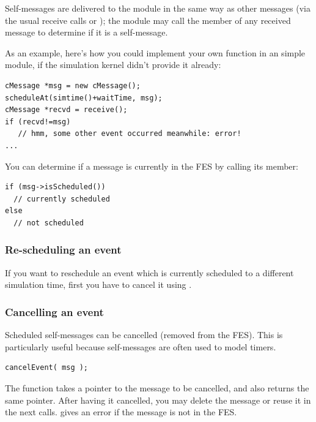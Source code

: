 Self-messages are delivered to the module in the same way as other
messages (via the usual receive calls or );
the module may call the  member of any received
message to determine if it is a self-message.

As an example, here's how you could implement your own 
function in an  simple module, if the simulation kernel
didn't provide it already:

\begin{verbatim}
cMessage *msg = new cMessage();
scheduleAt(simtime()+waitTime, msg);
cMessage *recvd = receive();
if (recvd!=msg)
   // hmm, some other event occurred meanwhile: error!
...
\end{verbatim}

You can determine if a message is currently in the FES
by calling its  member:

\begin{verbatim}
if (msg->isScheduled())
  // currently scheduled
else
  // not scheduled
\end{verbatim}


\subsubsection{Re-scheduling an event}

If you want to reschedule an event which is currently scheduled to a different
simulation time, first you have to cancel it using .


\subsubsection{Cancelling an event}

Scheduled self-messages can be cancelled
 (removed from the FES).
This is particularly useful because self-messages are often used
to model timers.

\begin{verbatim}
cancelEvent( msg );
\end{verbatim}

The  function takes a pointer to the message to
be cancelled, and also returns the same pointer. After having it
cancelled, you may delete the message or reuse it in the next
 calls.  gives an error if
the message is not in the FES.


